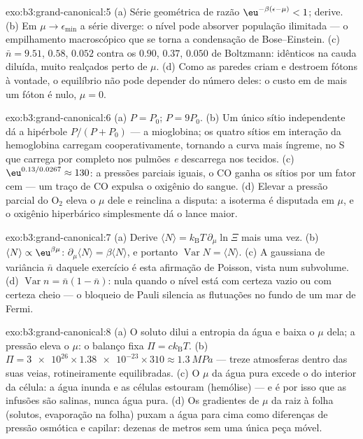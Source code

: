 \begin{solution}{exo:b3:grand-canonical:5}
(a) Série geométrica de razão $\eu^{-\beta(\epsilon-\mu)} < 1$;
derive. (b) Em $\mu \to \epsilon_{\min}$ a série
diverge: o nível pode absorver população ilimitada --- o
empilhamento macroscópico que se torna a condensação de Bose--Einstein. (c)
$\bar n = 9.51$, $0.58$, $0.052$ contra os $0.90$,
$0.37$, $0.050$ de Boltzmann: idênticos na cauda diluída, muito
realçados perto de $\mu$. (d) Como as paredes criam e destroem fótons à
vontade, o equilíbrio não pode depender do número deles: o custo em
 de mais um fóton é nulo, $\mu = 0$.
\end{solution}

\begin{solution}{exo:b3:grand-canonical:6}
(a) $P = P_0$; $P = 9P_0$. (b) Um único sítio independente dá a
hipérbole $P/(P + P_0)$ --- a mioglobina; os quatro sítios em interação
da hemoglobina carregam cooperativamente, tornando a curva mais
íngreme, no S que carrega por completo nos pulmões \emph{e} descarrega
nos tecidos. (c) $\eu^{0.13/0.0267} \approx 130$: a pressões parciais
iguais, o CO ganha os sítios por um fator cem --- um traço de CO
expulsa o oxigênio do sangue. (d) Elevar a pressão parcial do O$_2$
eleva o $\mu$ dele e reinclina a disputa: a isoterma é disputada em
$\mu$, e o oxigênio hiperbárico simplesmente dá o lance maior.
\end{solution}

\begin{solution}{exo:b3:grand-canonical:7}
(a) Derive $\langle N\rangle = k_{\text{B}}T\,\partial_\mu
\ln\Xi$ mais uma vez. (b) $\langle N\rangle \propto
\eu^{\beta\mu}$: $\partial_\mu\langle N\rangle = \beta\langle
N\rangle$, e portanto $\operatorname{Var}N = \langle N\rangle$. (c) A
gaussiana de variância $\bar n$ daquele exercício é esta afirmação de
Poisson, vista num subvolume. (d) $\operatorname{Var}n =
\bar n(1 - \bar n)$: nula quando o nível está com certeza vazio ou com
certeza cheio --- o bloqueio de Pauli silencia as flutuações no fundo
de um mar de Fermi.
\end{solution}

\begin{solution}{exo:b3:grand-canonical:8}
(a) O soluto dilui a entropia da água e baixa o $\mu$ dela; a pressão
eleva o $\mu$: o balanço fixa $\Pi = ck_{\text{B}}T$. (b) $\Pi =
\num{3e26} \times \num{1.38e-23} \times 310 \approx
\qty{1.3}{MPa}$ --- treze atmosferas dentro das suas veias,
rotineiramente equilibradas. (c) O $\mu$ da água pura excede o do
interior da célula: a água inunda e as células estouram (hemólise) ---
e é por isso que as infusões são salinas, nunca água pura. (d) Os
gradientes de $\mu$ da raiz à folha (solutos, evaporação na folha)
puxam a água para cima como diferenças de pressão osmótica e capilar:
dezenas de metros sem uma única peça móvel.
\end{solution}


